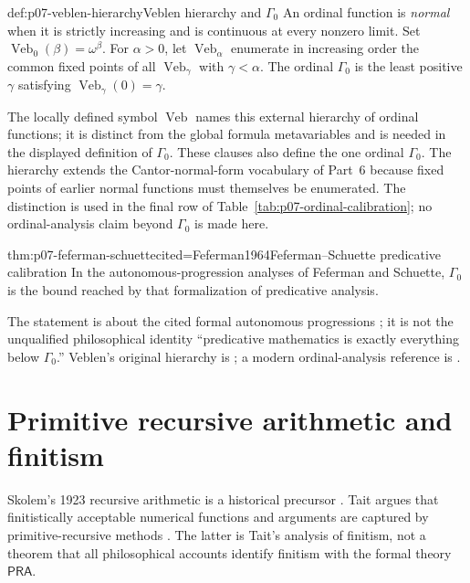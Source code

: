 \begin{hbdefinition}{def:p07-veblen-hierarchy}{Veblen hierarchy and \(\Gamma_0\)}
An ordinal function is \emph{normal} when it is strictly increasing and is
continuous at every nonzero limit.  Set
\(\operatorname{Veb}_0(\beta)=\omega^\beta\).  For \(\alpha>0\), let
\(\operatorname{Veb}_\alpha\) enumerate in increasing order the common fixed
points of all \(\operatorname{Veb}_\gamma\) with \(\gamma<\alpha\).  The
ordinal \(\Gamma_0\) is
the least positive \(\gamma\) satisfying
\(\operatorname{Veb}_\gamma(0)=\gamma\).

The locally defined symbol \(\operatorname{Veb}\) names this external
hierarchy of ordinal functions; it is distinct from the global formula
metavariables and is needed in the displayed definition of \(\Gamma_0\).
These clauses also define the one ordinal \(\Gamma_0\).  The hierarchy extends
the Cantor-normal-form vocabulary of Part~6 because
fixed points of earlier normal functions must themselves be enumerated.  The
distinction is used in the final row of
Table~\ref{tab:p07-ordinal-calibration}; no ordinal-analysis claim beyond
\(\Gamma_0\) is made here.
\end{hbdefinition}

\begin{hbtheorem}{thm:p07-feferman-schuette}{cited=Feferman1964}{Feferman--Schuette predicative calibration}
In the autonomous-progression analyses of Feferman and Schuette,
\(\Gamma_0\) is the bound reached by that formalization of predicative
analysis.
\end{hbtheorem}

The statement is about the cited formal autonomous progressions
\cite{Feferman1964,Schuette1977}; it is not the unqualified philosophical
identity ``predicative mathematics is exactly everything below
\(\Gamma_0\).''  Veblen's original hierarchy is \cite{Veblen1908}; a modern
ordinal-analysis reference is \cite{Pohlers2009}.

\section{Primitive recursive arithmetic and finitism}
\label{sec:p07-pra-finitism}

Skolem's 1923 recursive arithmetic is a historical precursor
\cite{Skolem1923}.  Tait argues that finitistically acceptable numerical
functions and arguments are captured by primitive-recursive methods
\cite{Tait1981}.  The latter is Tait's analysis of finitism, not a theorem
that all philosophical accounts identify finitism with the formal theory
\(\mathsf{PRA}\).

